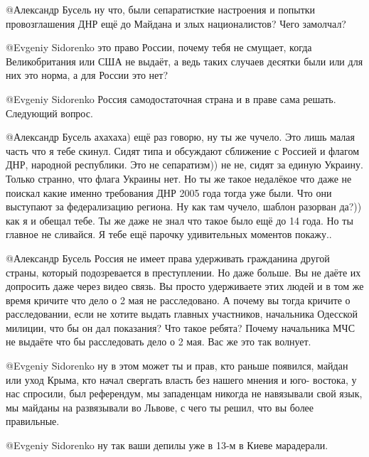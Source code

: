 \begin{multicols}{2}
\begin{itemize}

@Александр Бусель  ну что, были сепаратисткие настроения и попытки
провозглашения ДНР ещё до Майдана и злых националистов? Чего замолчал?


@Evgeniy Sidorenko  это право России, почему тебя не смущает, когда
Великобритания или США не выдаёт, а ведь таких случаев десятки были или для
них это норма, а для России это нет?


@Evgeniy Sidorenko  Россия самодостаточная страна и в праве сама решать.
Следующий вопрос.


@Александр Бусель     ахахаха) ещё раз говорю, ну ты же чучело. Это лишь малая
часть что я тебе скинул. Сидят типа и обсуждают сближение с Россией и флагом
ДНР, народной республики. Это не сепаратизм)) не не, сидят за единую Украину.
Только странно,  что флага Украины нет. Но ты же такое недалёкое что даже не
поискал какие именно требования ДНР 2005 года тогда уже были. Что они
выступают за федерализацию региона. Ну как там чучело, шаблон разорван да?))
как я и обещал тебе. Ты же даже не знал что такое было ещё до 14 года. Но ты
главное не сливайся. Я тебе ещё парочку удивительных моментов покажу.. 


@Александр Бусель  Россия не имеет права удерживать гражданина другой страны,
который подозревается в преступлении. Но даже больше. Вы не даёте их допросить
даже через видео связь. Вы просто удерживаете этих людей и в том же время
кричите что дело о 2 мая не расследовано. А почему вы тогда кричите о
расследовании, если не хотите выдать главных участников, начальника Одесской
милиции, что бы он дал показания? Что такое ребята? Почему начальника МЧС не
выдаёте что бы расследовать дело о 2 мая. Вас же это так волнует.


@Evgeniy Sidorenko  ну в этом может ты и прав, кто раньше появился, майдан или
уход Крыма, кто начал свергать власть без нашего мнения и юго- востока, у нас
спросили, был референдум, мы западенцам никогда не навязывали свой язык, мы
майданы на развязывали во Львове, с чего ты решил, что вы более правильные. 

 @Evgeniy Sidorenko  ну так ваши депилы уже в 13-м в Киеве марадерали.


\end{itemize}
\end{multicols}
